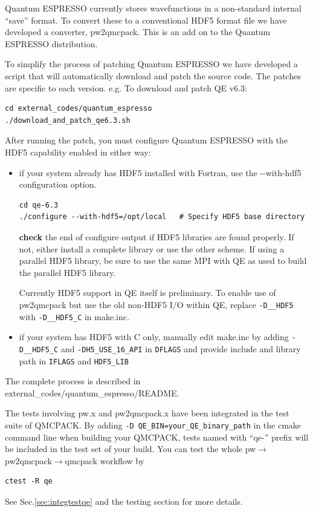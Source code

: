Quantum ESPRESSO currently stores wavefunctions in a non-standard internal
``save'' format. To convert these to a conventional HDF5 format file
we have developed a converter, pw2qmcpack. This is an add on to the
Quantum ESPRESSO distribution.

To simplify the process of patching Quantum ESPRESSO we have developed
a script that will automatically download and patch the source
code. The patches are specific to each version. e.g. To download and
patch QE v6.3:
\verbatimfont{\footnotesize}
\begin{verbatim}
cd external_codes/quantum_espresso
./download_and_patch_qe6.3.sh
\end{verbatim}
After running the patch, you must configure Quantum ESPRESSO with
the HDF5 capability enabled in either way:
\begin{itemize}
\item if your system already has HDF5 installed with Fortran, use the -{}-with-hdf5 configuration option.
\verbatimfont{\footnotesize}
\begin{verbatim}
cd qe-6.3
./configure --with-hdf5=/opt/local   # Specify HDF5 base directory
\end{verbatim}
   {\bf check} the end of configure output if HDF5 libraries are found properly.
   If not, either install a complete library or use the other scheme. If using a parallel HDF5 library, be sure to use
   the same MPI with QE as used to build the parallel HDF5 library.

   Currently HDF5 support in QE itself is preliminary. To enable use of pw2qmcpack
   but use the old non-HDF5 I/O within QE, replace \texttt{-D\_\_HDF5} with \texttt{-D\_\_HDF5\_C} in make.inc.
\item if your system has HDF5 with C only, manually edit make.inc by adding \texttt{-D\_\_HDF5\_C} and \texttt{-DH5\_USE\_16\_API}
   in \texttt{DFLAGS} and provide include and library path in \texttt{IFLAGS} and \texttt{HDF5\_LIB}
\end{itemize}

The complete process is described in external\_codes/quantum\_espresso/README.

The tests involving pw.x and pw2qmcpack.x have been integrated in the test suite of QMCPACK.
By adding \texttt{-D QE\_BIN=your\_QE\_binary\_path} in the cmake command line when building your QMCPACK,
tests named with ``qe-'' prefix will be included in the test set of your build.
You can test the whole pw$\to$pw2qmcpack$\to$qmcpack workflow by
\verbatimfont{\footnotesize}
\begin{verbatim}
ctest -R qe
\end{verbatim}
See Sec.\ref{sec:integtestqe} and the testing section for more details.

